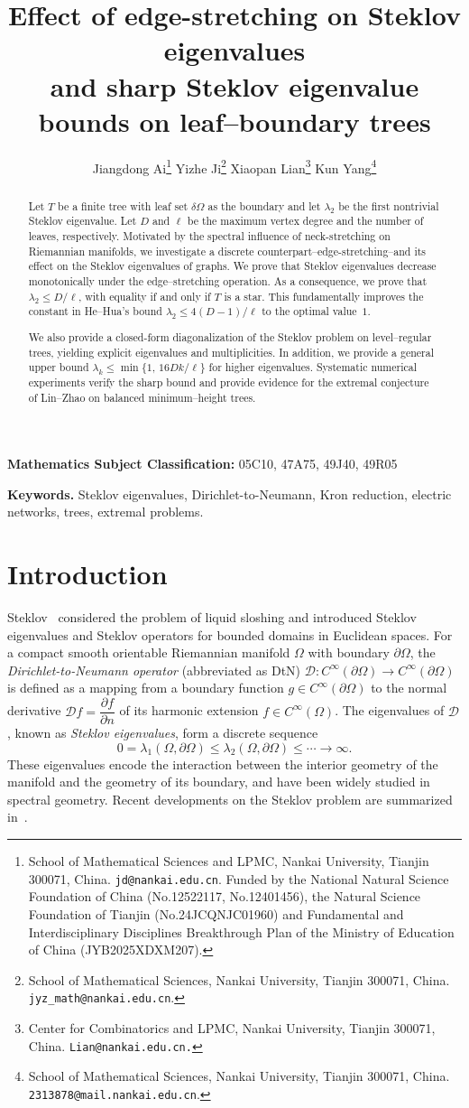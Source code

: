 \documentclass[11pt]{article}
\title{Effect of edge-stretching on Steklov eigenvalues \\and sharp Steklov eigenvalue bounds  on leaf--boundary trees}
\author{
    Jiangdong Ai\thanks{School of Mathematical Sciences and LPMC, Nankai University, Tianjin 300071, China. {\tt jd@nankai.edu.cn}. Funded by the National Natural Science Foundation of China (No.12522117, No.12401456), the Natural Science Foundation of Tianjin (No.24JCQNJC01960) and Fundamental and Interdisciplinary Disciplines Breakthrough Plan of the Ministry of Education of China (JYB2025XDXM207).}
    \hspace{2mm}
    Yizhe Ji\thanks{School of Mathematical Sciences, Nankai University, Tianjin 300071, China. {\tt jyz\_math@nankai.edu.cn}.}
    \hspace{2mm}
    Xiaopan Lian\thanks{Center for Combinatorics and LPMC, Nankai University, Tianjin 300071, China. {\tt{Lian@nankai.edu.cn.}}}
    \hspace{2mm}
    Kun Yang\thanks{School of Mathematical Sciences, Nankai University, Tianjin 300071, China. {\tt 2313878@mail.nankai.edu.cn}.}
}
\date{}
\theoremstyle{definition}
\theoremstyle{remark}
\newcommand{\dO}{\delta\Omega}
\newcommand{\pO}{\partial\Omega}
\newcommand{\Om}{\Omega}
\begin{document}
\maketitle

\begin{abstract}
Let $T$ be a finite tree with leaf set $\dO$ as the boundary and let $\lambda_2$ be the first nontrivial Steklov eigenvalue.
Let $D$ and $\ell$ be the maximum vertex degree and the number of leaves, respectively. Motivated by the spectral influence of neck-stretching on Riemannian manifolds, we investigate a discrete counterpart--edge-stretching--and its effect on the Steklov eigenvalues of graphs. We prove that Steklov eigenvalues decrease monotonically under the edge--stretching operation. As a consequence, we prove that $\lambda_2\le D/\ell$, with equality if and only if $T$ is a star.
This fundamentally improves the constant in He--Hua's bound $\lambda_2\le 4(D-1)/\ell$ to the optimal value~$1$.

We also provide a closed-form diagonalization of the Steklov problem on level--regular trees,
yielding explicit eigenvalues and multiplicities.
In addition, we provide a general upper bound $\lambda_k\le \min\{1,\,16Dk/\ell\}$ for higher eigenvalues.
Systematic numerical experiments verify the sharp bound and provide evidence for the extremal conjecture of Lin--Zhao on balanced minimum--height trees.
\end{abstract}

\medskip
\noindent\textbf{Mathematics Subject Classification:} 05C10, 47A75, 49J40, 49R05

\medskip
\noindent\textbf{Keywords.} Steklov eigenvalues, Dirichlet-to-Neumann, Kron reduction, electric networks, trees, extremal problems.


\section{Introduction}\label{sec:intro}

Steklov~\cite{Stekloff1902} considered the problem of liquid sloshing and introduced Steklov eigenvalues and Steklov operators for bounded domains in Euclidean spaces. For a compact smooth orientable Riemannian manifold $\Om$ with boundary $\partial\Om$, the \emph{Dirichlet-to-Neumann operator} (abbreviated as DtN) $\mathcal{D}:C^\infty(\pO)\rightarrow C^\infty(\pO)$ is defined as a mapping from a boundary function $g\in C^\infty(\pO)$ to the normal derivative $\mathcal{D}f=\dfrac{\partial f}{\partial n}$ of its harmonic extension $f\in C^\infty(\Om)$. The eigenvalues of $\mathcal{D}$, known as \emph{Steklov eigenvalues}, form a discrete sequence
\[
0=\lambda_1(\Om,\pO)\le \lambda_2(\Om,\pO)\le \cdots\rightarrow\infty.
\]
These eigenvalues encode the interaction between the interior geometry of the manifold and the geometry of its boundary, and have been widely studied in spectral geometry. Recent developments on the Steklov problem are summarized in~\cite{CGGS2024,GirouardPolterovich2017}. 
\end{document}
